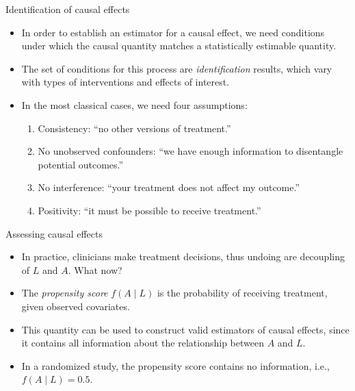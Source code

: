 \documentclass[ignorenonframetext,]{beamer}
\providecommand{\tightlist}{%
  \setlength{\itemsep}{0pt}\setlength{\parskip}{0pt}}
\begin{document}
\begin{frame}{Identification of causal effects}
\protect\hypertarget{identification-of-causal-effects}{}

\begin{itemize}[<+->]
\tightlist
\item
  In order to establish an estimator for a causal effect, we need
  conditions under which the causal quantity matches a statistically
  estimable quantity.
\item
  The set of conditions for this process are \emph{identification}
  results, which vary with types of interventions and effects of
  interest.
\item
  In the most classical cases, we need four assumptions:

  \begin{enumerate}[<+->]
  \tightlist
  \item
    Consistency: ``no other versions of treatment.''
  \item
    No unobserved confounders: ``we have enough information to
    disentangle potential outcomes.''
  \item
    No interference: ``your treatment does not affect my outcome.''
  \item
    Positivity: ``it must be possible to receive treatment.''
  \end{enumerate}
\end{itemize}

\end{frame}

\begin{frame}{Assessing causal effects}
\protect\hypertarget{assessing-causal-effects}{}

\begin{itemize}[<+->]
\tightlist
\item
  In practice, clinicians make treatment decisions, thus undoing are
  decoupling of \(L\) and \(A\). What now?
\item
  The \emph{propensity score} \(f(A \mid L)\) is the probability of
  receiving treatment, given observed covariates.
\item
  This quantity can be used to construct valid estimators of causal
  effects, since it contains all information about the relationship
  between \(A\) and \(L\).
\item
  In a randomized study, the propensity score contains no information,
  i.e., \(f(A \mid L) = 0.5\).
\end{itemize}

\end{frame}
\end{document}
